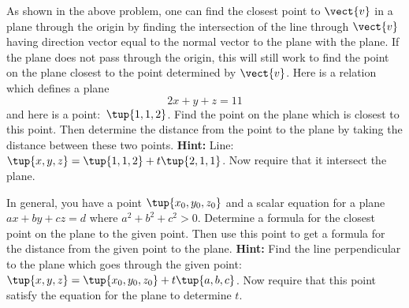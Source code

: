 \begin{enumialphparenastyle}
\begin{ex} As shown in the above problem, one can find the closest point to $\vect{v}$ in a plane through the origin by finding the intersection of the line
through $\vect{v}$ having direction vector equal to the normal vector to the
plane with the plane. If the plane does not pass through the origin, this
will still work to find the point on the plane closest to the point
determined by $\vect{v}$. Here is a relation which defines a plane 
\begin{equation*}
2x+y+z=11
\end{equation*}
and here is a point:\ $\tup{1,1,2}$. Find the point on the plane
which is closest to this point. Then determine the distance from the point
to the plane by taking the distance between these two points. \textbf{Hint: }
Line: $\tup{x,y,z} =\tup{1,1,2} +t\tup{2,1,1}$. Now
require that it intersect the plane. $\ $
\end{ex}

\begin{ex} In general, you have a point $\tup{x_{0},y_{0},z_{0}} $ and a
scalar equation for a plane $ax+by+cz=d$ where $a^{2}+b^{2}+c^{2}>0$.
Determine a formula for the closest point on the plane to the given point.
Then use this point to get a formula for the distance from the given point
to the plane. \textbf{Hint: }Find the line perpendicular to the plane which
goes through the given point: $\tup{x,y,z} =\tup{
x_{0},y_{0},z_{0}} +t\tup{a,b,c}$. Now require that this
point satisfy the equation for the plane to determine $t$.
\end{ex}

\end{enumialphparenastyle}